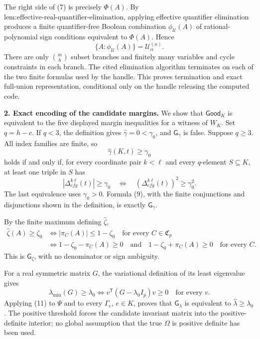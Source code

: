 The right side of (7) is precisely \(\Phi(A)\).  By \(\text{lem:effective-real-quantifier-elimination}\), applying effective quantifier elimination produces a finite quantifier-free Boolean combination \(\phi_{\mathcal U}(A)\) of rational-polynomial sign conditions equivalent to \(\Phi(A)\).  Hence
\[
 \{A:\phi_{\mathcal U}(A)\}=\mathcal U^{(n)}_\alpha.
\tag{8}
\]
There are only \(\binom mh\) subset branches and finitely many variables and cycle constraints in each branch.  The cited elimination algorithm terminates on each of the two finite formulas used by the handle.  This proves termination and exact full-union representation, conditional only on the handle releasing the computed code.

\textbf{2. Exact encoding of the candidate margins.}
We show that \(\mathsf{Good}_K\) is equivalent to the five displayed margin inequalities for a witness of \(W_K\).  Set \(q=h-c\).  If \(q<3\), the definition gives \(\widehat\gamma=0<\gamma_0\), and \(\mathsf G_\gamma\) is false.  Suppose \(q\geq3\).  All index families are finite, so
\[
 \widehat\gamma(K,t)\geq\gamma_0
\]
holds if and only if, for every coordinate pair \(k<\ell\) and every \(q\)-element \(S\subseteq K\), at least one triple in \(S\) has
\[
 |\Delta_{efg}^{k\ell}(t)|\geq\gamma_0
 \quad\Longleftrightarrow\quad
 (\Delta_{efg}^{k\ell}(t))^2\geq\gamma_0^2.
\tag{9}
\]
The last equivalence uses \(\gamma_0>0\).  Formula (9), with the finite conjunctions and disjunctions shown in the definition, is exactly \(\mathsf G_\gamma\).

By the finite maximum defining \(\widehat\zeta\),
\[
\begin{aligned}
 \widehat\zeta(A)\geq\zeta_0
 &\Longleftrightarrow
 |\pi_C(A)|\leq1-\zeta_0
 \quad\text{for every }C\in\mathfrak C_p\\
 &\Longleftrightarrow
 1-\zeta_0-\pi_C(A)\geq0
 \quad\text{and}\quad
 1-\zeta_0+\pi_C(A)\geq0
 \quad\text{for every }C.
\end{aligned}
\tag{10}
\]
This is \(\mathsf G_\zeta\), with no denominator or sign ambiguity.

For a real symmetric matrix \(G\), the variational definition of its least eigenvalue gives
\[
 \lambda_{\min}(G)\geq\lambda_0
 \Longleftrightarrow
 v^{\mathsf T}(G-\lambda_0I_p)v\geq0
 \quad\text{for every }v.
\tag{11}
\]
Applying (11) to \(\Psi\) and to every \(\Gamma_e\), \(e\in K\), proves that \(\mathsf G_\lambda\) is equivalent to \(\widehat\lambda\geq\lambda_0\).  The positive threshold forces the candidate invariant matrix into the positive-definite interior; no global assumption that the true \(\Omega\) is positive definite has been used.

